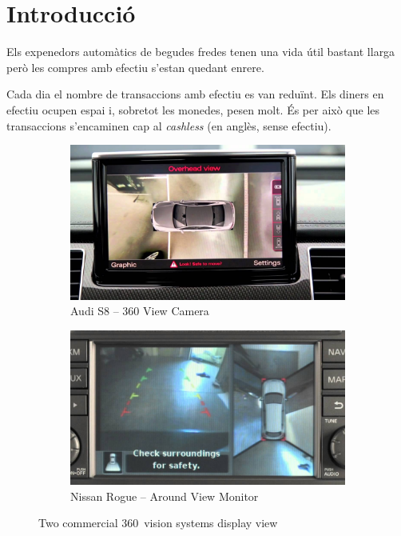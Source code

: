 \chapter{Introducció}

Els expenedors automàtics de begudes fredes tenen una vida útil bastant llarga però les compres amb efectiu s'estan quedant enrere.

Cada dia el nombre de transaccions amb efectiu es van reduïnt. Els diners en efectiu ocupen espai i, sobretot les monedes, pesen molt. És per això que les transaccions s'encaminen cap al \textit{cashless} (en anglès, sense efectiu).


\begin{figure}
	\centering
	\begin{subfigure}[b]{0.45\textwidth}
		\includegraphics[width=\textwidth]{images/audi-intro}
		\caption{Audi S8 -- 360 View Camera}
		\label{fig:audi-intro-example}
	\end{subfigure}
	\hspace{0.5cm}
	\begin{subfigure}[b]{0.45\textwidth}
		\includegraphics[width=\textwidth]{images/nissan-intro}
		\caption{Nissan Rogue -- Around View Monitor}
		\label{fig:nissan-intro-example}
	\end{subfigure}
	\caption{Two commercial 360\degree~vision systems display view}
	\label{fig:intro-example}
\end{figure}

